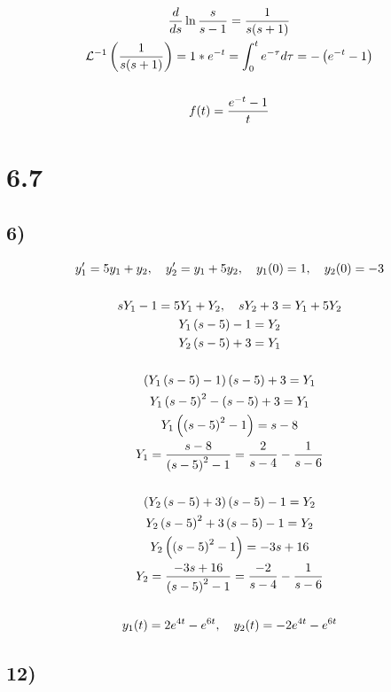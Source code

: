\begin{gather*}
	\frac{d}{ds} \ln{\frac{s}{s - 1}} = \frac{1}{s (s + 1)} \\
	\mathcal{L}^{-1}\left( \frac{1}{s (s + 1)} \right) =
	1 * e^{-t} =
	\int_0^t{e^{- \tau} d\tau} = - \left( e^{-t} - 1 \right) \\ \\
	f(t) = \frac{e^{-t} - 1}{t}
\end{gather*}


\newpage


\section*{6.7}


\subsection*{6)}


\begin{gather*}
	y_1' = 5 y_1 + y_2, \quad
	y_2' = y_1 + 5 y_2, \quad
	y_1(0) = 1, \quad
	y_2(0) = -3 \\ \\
	s Y_1 - 1 = 5 Y_1 + Y_2, \quad
	s Y_2 + 3 = Y_1 + 5 Y_2 \\
	Y_1 \left( s - 5 \right) - 1	= Y_2 \\
	Y_2 \left( s - 5 \right) + 3 = Y_1 \\ \\
	\left( Y_1 \left( s - 5 \right) - 1 \right) \left( s - 5 \right) + 3 = Y_1 \\
	Y_1 \left( s - 5 \right)^2 - \left( s - 5 \right) + 3 = Y_1 \\
	Y_1 \left( \left( s - 5 \right)^2 - 1 \right) = s - 8 \\
	Y_1 = \frac{s - 8}{\left( s - 5 \right)^2 - 1} =
	\frac{2}{s - 4} - \frac{1}{s - 6} \\ \\
	\left( Y_2 \left( s - 5 \right) + 3 \right) \left( s - 5 \right) - 1 = Y_2 \\
	Y_2 \left( s - 5 \right)^2 + 3 \left( s - 5 \right) - 1 = Y_2 \\
	Y_2 \left( \left( s - 5 \right)^2 - 1 \right) = -3 s + 16 \\
	Y_2 = \frac{-3 s + 16}{\left( s - 5 \right)^2 - 1} =
	\frac{-2}{s - 4} - \frac{1}{s - 6} \\ \\
	y_1(t) = 2 e^{4 t} - e^{6 t}, \quad
	y_2(t) = - 2 e^{4 t} - e^{6 t}
\end{gather*}


\subsection*{12)}


